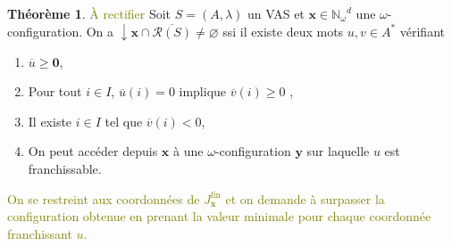 \documentclass[a4paper,final]{article}
\theoremstyle{definition}
\newtheorem{Theorem}{Théorème}
\let\geq\geqslant
\newcommand{\lucas}[1]{\textcolor{olive}{#1}}
\let\inter\cap
\let\vide\varnothing
\newcommand{\Nomega}{\ensuremath{\mathbb{N}_\omega}}
\newcommand{\vect}[1]{\ensuremath{\mathbf{#1}}}
\newcommand{\valeur}[1]{\ensuremath{\overline{#1}}}
\newcommand{\inirat}{\mathcal{R}}
\newcommand{\Jfin}[1]{J^\text{fin}_#1}
\begin{document}
\begin{Theorem}
\lucas{À rectifier}
Soit $S = (A,\lambda)$ un VAS et $\vect{x}\in\Nomega^d$ une $\omega$-configuration.
On a $\downarrow \vect{x} \inter \overline{\inirat(S)} \neq \vide$ ssi
il existe deux mots $u,v \in A^*$ vérifiant
\begin{enumerate}
    \item $\valeur{u} \geq \vect{0}$,
    \item Pour tout $i \in I$, $\valeur{u}(i)=0$ implique $\valeur{v}(i) \geq 0$ ,
    \item Il existe $i\in I$ tel que $\valeur{v}(i) < 0$,
    \item On peut accéder depuis $\vect{x}$ à une $\omega$-configuration $\vect{y}$ sur laquelle $u$ est franchissable.
\end{enumerate}

\lucas{On se restreint aux coordonnées de $\Jfin{\vect{x}}$ et on demande à surpasser la configuration obtenue en prenant la valeur minimale pour chaque coordonnée franchissant $u$.}
\end{Theorem}

\end{document}

